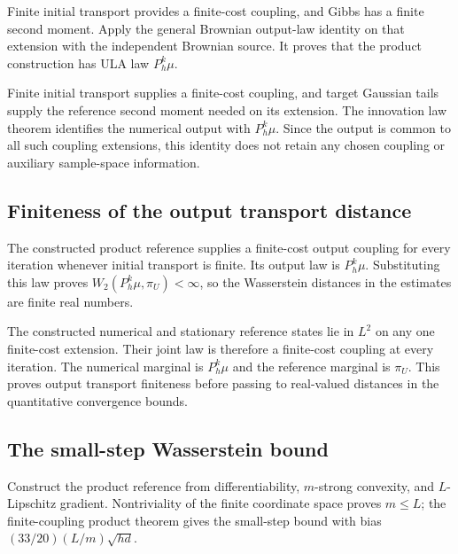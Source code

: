 \documentclass[11pt,a4paper]{report}
\begin{document}
Finite initial transport provides a finite-cost coupling, and Gibbs has a finite second moment. Apply the general Brownian output-law identity on that extension with the independent Brownian source. It proves that the product construction has ULA law \(P_h^k\mu\).



Finite initial transport supplies a finite-cost coupling, and target Gaussian tails supply the reference second moment needed on its extension. The innovation law theorem identifies the numerical output with \(P_h^k\mu\). Since the output is common to all such coupling extensions, this identity does not retain any chosen coupling or auxiliary sample-space information.

\subsection{\texorpdfstring{Finiteness of the output transport distance}{Finiteness of the output transport distance}}
\label{report-step-UnadjustedLangevin-CanonicalULA-lean-6}


The constructed product reference supplies a finite-cost output coupling for every iteration whenever initial transport is finite. Its output law is \(P_h^k\mu\). Substituting this law proves \(W_2(P_h^k\mu,\pi_U)<\infty\), so the Wasserstein distances in the estimates are finite real numbers.



The constructed numerical and stationary reference states lie in \(L^2\) on any one finite-cost extension. Their joint law is therefore a finite-cost coupling at every iteration. The numerical marginal is \(P_h^k\mu\) and the reference marginal is \(\pi_U\). This proves output transport finiteness before passing to real-valued distances in the quantitative convergence bounds.

\subsection{\texorpdfstring{The small-step Wasserstein bound}{The small-step Wasserstein bound}}
\label{report-step-UnadjustedLangevin-CanonicalULA-lean-7}


Construct the product reference from differentiability, \(m\)-strong convexity, and \(L\)-Lipschitz gradient. Nontriviality of the finite coordinate space proves \(m\le L\); the finite-coupling product theorem gives the small-step bound with bias \((33/20)(L/m)\sqrt{hd}\).
\end{document}
